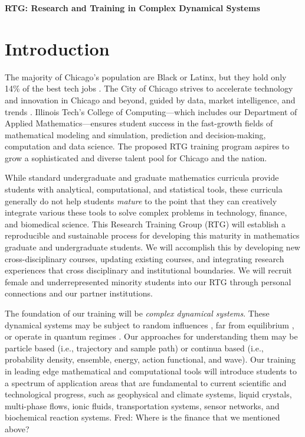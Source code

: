 \documentclass[11pt]{NSFamsart}
\newcommand{\FredNote}[1]{{\color{blue} Fred: #1}}
\begin{document}
  

\centerline{\large \textbf{RTG: Research and Training in Complex Dynamical Systems}}

\section{Introduction}

The majority of Chicago's population are Black or Latinx, but they hold only 14\% of the best tech jobs \cite{P33}. 
The City of Chicago strives to accelerate  technology and innovation in Chicago and beyond, guided by data, market intelligence, and trends \cite{Chicago}. Illinois Tech's College of Computing---which includes our Department of Applied Mathematics---ensures student success in the fast-growth fields of mathematical modeling and simulation, prediction and decision-making, computation and data science. The proposed RTG training program aspires to grow a sophisticated and diverse talent pool for Chicago and the nation.


While standard undergraduate and graduate mathematics curricula provide students with  analytical, computational, and statistical tools, these curricula generally do not help students \emph{mature} to the point that they can creatively integrate various these tools to solve complex problems in technology, finance, and biomedical science. This Research Training Group (RTG) will establish a reproducible and sustainable process for developing this maturity in mathematics graduate and undergraduate students. We will accomplish this by developing new cross-disciplinary courses, updating existing courses, and integrating research experiences that cross disciplinary and institutional boundaries.  We will recruit female and underrepresented minority students into our RTG through personal connections and our partner institutions.

The foundation of our training will be \emph{complex dynamical systems}.  These dynamical systems may be subject to random influences \cite{Arnold, DuanBook2015}, far from equilibrium \cite{liu2009introduction}, or operate in quantum regimes \cite{Dittrich2016}. Our approaches for understanding them may be particle based (i.e., trajectory and sample path)  or continua based (i.e., probability density, ensemble, energy, action functional, and wave).  Our training in leading edge mathematical and computational tools will introduce students to a spectrum of application areas that are fundamental to current scientific and technological progress, such as geophysical and climate systems, liquid crystals, multi-phase flows, ionic fluids,  transportation systems, sensor networks, and biochemical reaction systems. \FredNote{Where is the finance that we mentioned above?}
\end{document}
